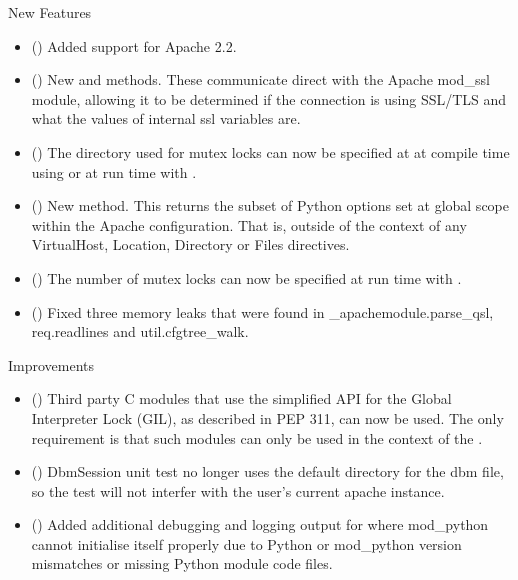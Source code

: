 
  New Features

  \begin{itemize}
    \item
      ()
      Added support for Apache 2.2.
    \item
      ()
      New  and  methods.
      These communicate direct with the Apache mod_ssl module, allowing
      it to be determined if the connection is using SSL/TLS and what the
      values of internal ssl variables are.
    \item
      ()
      The directory used for mutex locks can now be specified at 
      at compile time using 
      or at run time with .
    \item
      ()
      New  method. This returns the subset
      of Python options set at global scope within the Apache configuration.
      That is, outside of the context of any VirtualHost, Location, Directory
      or Files directives.
    \item
      ()
      The number of mutex locks can now be specified at run time with
      .
    \item
     ()
      Fixed three memory leaks that were found in _apachemodule.parse_qsl, req.readlines
      and util.cfgtree_walk.
  \end{itemize}

  Improvements

  \begin{itemize}
    \item
      ()
      Third party C modules that use the simplified API for the Global
      Interpreter Lock (GIL), as described in PEP 311, can now be used. The
      only requirement is that such modules can only be used in the context
      of the .
    \item
      ()
      DbmSession unit test no longer uses the default directory for the dbm file,
      so the test will not interfer with the user's current apache instance.
    \item
      ()
      Added additional debugging and logging output for where mod_python
      cannot initialise itself properly due to Python or mod_python version
      mismatches or missing Python module code files.
  \end{itemize}

